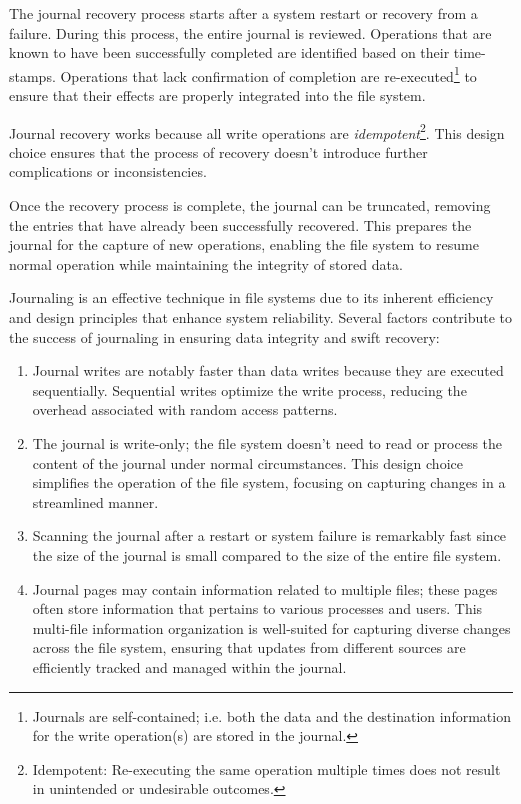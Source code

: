\documentclass{report}
\newcommand{\asideBegin}[1]{\begin{tcolorbox}[colback=orange!5!white,colframe=black!75!orange,title={Aside:
      #1}]}
\newcommand{\asideEnd}{\end{tcolorbox}}
\newcommand{\corollaryBegin}[1]{\begin{tcolorbox}[colback=teal!5!white,colframe=black!75!teal,title={Corollary:
      #1}]}
\newcommand{\corollaryEnd}{\end{tcolorbox}}
\begin{document}
The journal recovery process starts after a system restart or recovery from a failure. During this
process, the entire journal is reviewed. Operations that are known to have been successfully
completed are identified based on their time-stamps. Operations that lack confirmation of completion
are re-executed\footnote{Journals are self-contained; i.e. both the data and the destination
information for the write operation(s) are stored in the journal.} to ensure that their effects are
properly integrated into the file system.

\asideBegin{Idempotent}
Journal recovery works because all write operations are \textit{idempotent}\footnote{Idempotent:
Re-executing the same operation multiple times does not result in unintended or undesirable
outcomes.}. This design choice ensures that the process of recovery doesn't introduce further
complications or inconsistencies.
\asideEnd

Once the recovery process is complete, the journal can be truncated, removing the entries that have
already been successfully recovered. This prepares the journal for the capture of new operations,
enabling the file system to resume normal operation while maintaining the integrity of stored data. 


\corollaryBegin{Why Journaling Works}
Journaling is an effective technique in file systems due to its inherent efficiency and design
principles that enhance system reliability. Several factors contribute to the success of journaling
in ensuring data integrity and swift recovery:

\begin{enumerate}[label=\textit{(\roman*)}]
\item Journal writes are notably faster than data writes because they are executed
  sequentially. Sequential writes optimize the write process, reducing the overhead associated with
  random access patterns.
\item The journal is write-only; the file system doesn't need to read or process the content of the
  journal under normal circumstances. This design choice simplifies the operation of the file system,
  focusing on capturing changes in a streamlined manner.
\item Scanning the journal after a restart or system failure is remarkably fast since the size of
  the journal is small compared to the size of the entire file system.
\item Journal pages may contain information related to multiple files; these pages often store
  information that pertains to various processes and users. This multi-file information organization
  is well-suited for capturing diverse changes across the file system, ensuring that updates from
  different sources are efficiently tracked and managed within the journal.
\end{enumerate}
\corollaryEnd
\end{document}
